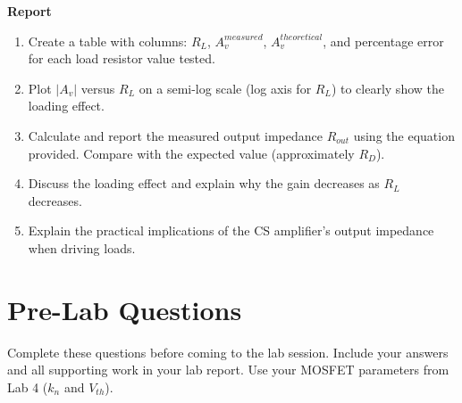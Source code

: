 \documentclass[10pt]{article}
\begin{document}
\textbf{Report}
\begin{enumerate}
    \item Create a table with columns: $R_L$, $A_v^{measured}$, $A_v^{theoretical}$, and percentage error for each load resistor value tested.
    \item Plot $|A_v|$ versus $R_L$ on a semi-log scale (log axis for $R_L$) to clearly show the loading effect.
    \item Calculate and report the measured output impedance $R_{out}$ using the equation provided. Compare with the expected value (approximately $R_D$).
    \item Discuss the loading effect and explain why the gain decreases as $R_L$ decreases.
    \item Explain the practical implications of the CS amplifier's output impedance when driving loads.\\
\end{enumerate}

\section{Pre-Lab Questions}
\label{sec:prelab}

Complete these questions before coming to the lab session.  Include your answers and all supporting work in your lab report.  Use your MOSFET parameters from Lab 4 ($k_n$ and $V_{th}$).
\end{document}
